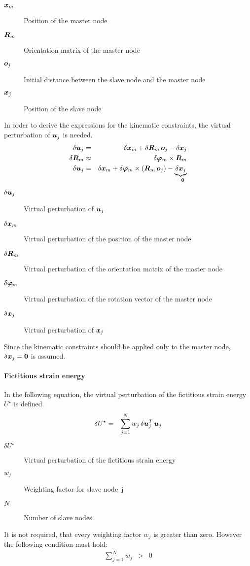\begin{description}
\item[$\bm{x}_m$] Position of the master node
\item[$\bm{R}_m$] Orientation matrix of the master node
\item[$\bm{o}_j$] Initial distance between the slave node and the master node
\item[$\bm{x}_j$] Position of the slave node
\end{description}
In order to derive the expressions for the kinematic constraints, the virtual perturbation of $\bm{u}_j$ is needed.
\begin{eqnarray}
\delta\bm{u}_j & = & \delta\bm{x}_m + \delta\bm{R}_m \, \bm{o}_j - \delta\bm{x}_j \\
\delta\bm{R}_m & \approx & \delta\bm{\varphi}_m \times \bm{R}_m \\
\delta\bm{u}_j & = & \delta\bm{x}_m + \delta\bm{\varphi}_m \times \left( \bm{R}_m \, \bm{o}_j \right) - \underbrace{\delta{\bm{x}}_j}_{=\bm{0}} \label{eq:rbdispjoint:deltau}
\end{eqnarray}
\begin{description}
\item[$\delta\bm{u}_j$] Virtual perturbation of $\bm{u}_j$
\item[$\delta\bm{x}_m$] Virtual perturbation of the position of the master node
\item[$\delta\bm{R}_m$] Virtual perturbation of the orientation matrix of the master node
\item[$\delta\bm{\varphi}_m$] Virtual perturbation of the rotation vector of the master node
\item[$\delta\bm{x}_j$] Virtual perturbation of $\bm{x}_j$
\end{description}
Since the kinematic constraints should be applied only to the master node, $\delta\bm{x}_j=\bm{0}$ is assumed.
\paragraph{Fictitious strain energy}
In the following equation, the virtual perturbation of the fictitious strain energy $U^{\star}$ is defined.
\begin{eqnarray}
\delta U^{\star} & = & \sum_{j=1}^{N} w_j \, \delta\bm{u}_j^T \, \bm{u}_j \label{eq:rbdispjoint:deltaU}
\end{eqnarray}
\begin{description}
\item[$\delta U^{\star}$] Virtual perturbation of the fictitious strain energy
\item[$w_j$] Weighting factor for slave node~j
\item[$N$] Number of slave nodes
\end{description}
It is not required, that every weighting factor $w_j$ is greater than zero. However the following condition must hold:
\begin{eqnarray}
\sum_{j=1}^N w_j &>& 0
\end{eqnarray}
